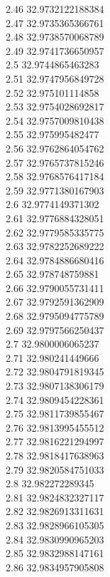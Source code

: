 {2.46	32.9732122188384\\
2.47	32.9735365366761\\
2.48	32.9738570068789\\
2.49	32.9741736650957\\
2.5	32.9744865463283\\
2.51	32.9747956849728\\
2.52	32.975101114858\\
2.53	32.9754028692817\\
2.54	32.9757009810438\\
2.55	32.975995482477\\
2.56	32.9762864054762\\
2.57	32.9765737815246\\
2.58	32.9768576417184\\
2.59	32.9771380167903\\
2.6	32.9774149371302\\
2.61	32.9776884328051\\
2.62	32.9779585335775\\
2.63	32.9782252689222\\
2.64	32.9784886680416\\
2.65	32.978748759881\\
2.66	32.9790055731411\\
2.67	32.9792591362909\\
2.68	32.9795094775789\\
2.69	32.9797566250437\\
2.7	32.9800006065237\\
2.71	32.980241449666\\
2.72	32.9804791819345\\
2.73	32.9807138306179\\
2.74	32.9809454228361\\
2.75	32.9811739855467\\
2.76	32.9813995455512\\
2.77	32.9816221294997\\
2.78	32.9818417638963\\
2.79	32.9820584751033\\
2.8	32.982272289345\\
2.81	32.9824832327117\\
2.82	32.9826913311631\\
2.83	32.9828966105305\\
2.84	32.9830990965203\\
2.85	32.9832988147161\\
2.86	32.9834957905808\\
}
